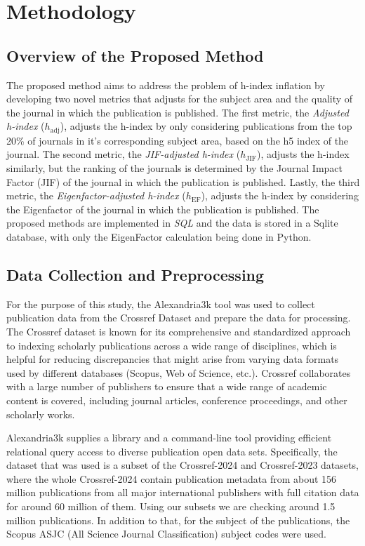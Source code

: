 \chapter{Methodology}
\label{ch:methods}

\section{Overview of the Proposed Method}

The proposed method aims to address the problem of h-index inflation by
developing two novel metrics that adjusts for the subject area and the quality
of the journal in which the publication is published. The first metric, the
\textit{Adjusted h-index} ($h_{\text{adj}}$), adjusts the h-index by only
considering publications from the top 20\% of journals in it's corresponding
subject area, based on the h5 index of the journal. The second metric, the
\textit{JIF-adjusted h-index} ($h_{\text{JIF}}$), adjusts the h-index
similarly, but the ranking of the journals is determined by the Journal Impact
Factor (JIF) of the journal in which the publication is published. Lastly, the
third metric, the \textit{Eigenfactor-adjusted h-index} ($h_{\text{EF}}$),
adjusts the h-index by considering the Eigenfactor of the journal in which the
publication is published. The proposed methods are implemented in \emph{SQL}
and the data is stored in a Sqlite database, with only the EigenFactor
calculation being done in Python.

\section{Data Collection and Preprocessing}

For the purpose of this study, the Alexandria3k \cite{Spi23g} tool was used to
collect publication data from the Crossref Dataset \cite{Crossref2020} and
prepare the data for processing. The Crossref dataset is known for its
comprehensive and standardized approach to indexing scholarly publications
across a wide range of disciplines, which is helpful for reducing discrepancies
that might arise from varying data formats used by different databases (Scopus,
Web of Science, etc.). Crossref collaborates with a large number of publishers
to ensure that a wide range of academic content is covered, including journal
articles, conference proceedings, and other scholarly works.

Alexandria3k supplies a library and a command-line tool providing efficient
relational query access to diverse publication open data sets. Specifically,
the dataset that was used is a subset of the Crossref-2024 and Crossref-2023
datasets, where the whole Crossref-2024 contain publication metadata from about
156 million publications from all major international publishers with full
citation data for around 60 million of them. Using our subsets we are checking
around 1.5 million publications. In addition to that, for the subject of the
publications, the Scopus ASJC (All Science Journal Classification) subject
codes were used.

